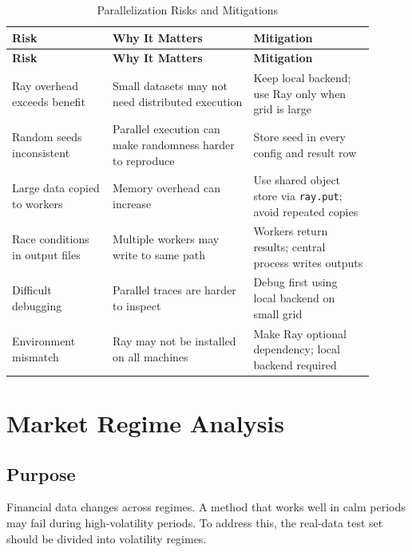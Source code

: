 \documentclass[11pt]{article}
\begin{document}
\begin{longtable}{p{0.25\linewidth} p{0.35\linewidth} p{0.30\linewidth}}
\caption{Parallelization Risks and Mitigations} \\
\toprule
\textbf{Risk} & \textbf{Why It Matters} & \textbf{Mitigation} \\
\midrule
\endfirsthead

\toprule
\textbf{Risk} & \textbf{Why It Matters} & \textbf{Mitigation} \\
\midrule
\endhead

Ray overhead exceeds benefit & Small datasets may not need distributed execution & Keep local backend; use Ray only when grid is large \\

Random seeds inconsistent & Parallel execution can make randomness harder to reproduce & Store seed in every config and result row \\

Large data copied to workers & Memory overhead can increase & Use shared object store via \texttt{ray.put}; avoid repeated copies \\

Race conditions in output files & Multiple workers may write to same path & Workers return results; central process writes outputs \\

Difficult debugging & Parallel traces are harder to inspect & Debug first using local backend on small grid \\

Environment mismatch & Ray may not be installed on all machines & Make Ray optional dependency; local backend required \\

\bottomrule
\end{longtable}

\section{Market Regime Analysis}

\subsection{Purpose}

Financial data changes across regimes. A method that works well in calm periods may fail during high-volatility periods. To address this, the real-data test set should be divided into volatility regimes.
\end{document}
